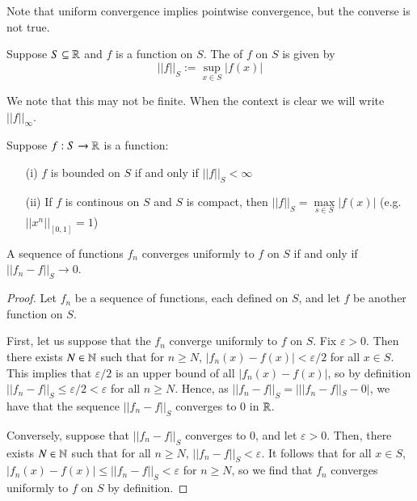 \begin{remark}
    Note that uniform convergence implies pointwise convergence, but the converse is not true.
\end{remark}

\begin{definition}
    Suppose $S \subseteq \mathbb R$ and $f$ is a function on $S$. The  of $f$ on $S$ is given by \begin{equation*}
        ||f||_S := \sup\limits_{x\in S}|f(x)|
    \end{equation*}
\end{definition}
We note that this may not be finite. When the context is clear we will write $||f||_{\infty}$. 

\begin{remark}
    Suppose $f:S\rightarrow \mathbb R$ is a function: \begin{enumerate}
        \item[(i)] $f$ is bounded on $S$ if and only if $||f||_S < \infty$
        \item[(ii)] If $f$ is continous on $S$ and $S$ is compact, then $||f||_S = \max\limits_{s \in S}|f(x)|$ (e.g. $||x^n||_{[0,1]} = 1$)
    \end{enumerate}
\end{remark}


\begin{proposition}
    A sequence of functions $f_n$ converges uniformly to $f$ on $S$ if and only if $||f_n-f||_S\rightarrow 0$.
\end{proposition}
\begin{proof}
    Let $f_n$ be a sequence of functions, each defined on $S$, and let $f$ be another function on $S$.

    First, let us suppose that the $f_n$ converge uniformly to $f$ on $S$. Fix $\varepsilon > 0$. Then there exists $N \in \mathbb N$ such that for $n \geq N$, $|f_n(x) - f(x)| < \varepsilon/2$ for all $x \in S$. This implies that $\varepsilon/2$ is an upper bound of all $|f_n(x)-f(x)|$, so by definition $||f_n-f||_S \leq \varepsilon/2 < \varepsilon$ for all $n \geq N$. Hence, as $||f_n-f||_S = |||f_n -f||_S - 0|$, we have that the sequence $||f_n-f||_S$ converges to $0$ in $\mathbb R$.

    Conversely, suppose that $||f_n-f||_S$ converges to $0$, and let $\varepsilon > 0$. Then, there exists $N \in \mathbb N$ such that for all $n \geq N$, $||f_n-f||_S < \varepsilon$. It follows that for all $x \in S$, $|f_n(x) - f(x)| \leq ||f_n-f||_S < \varepsilon$ for $n \geq N$, so we find that $f_n$ converges uniformly to $f$ on $S$ by definition.
\end{proof}

